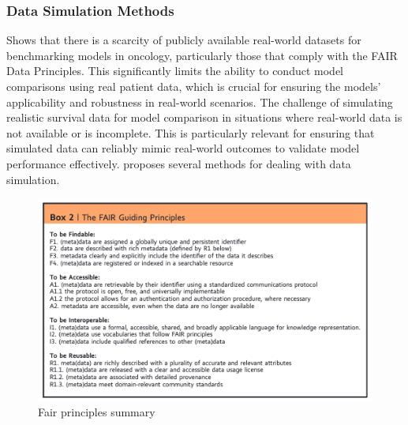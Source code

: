 \subsubsection{Data Simulation Methods}
\noindent \parencite{thurow_how_2023} Shows that there is a scarcity of publicly available real-world datasets for benchmarking models in oncology, particularly those that comply with the FAIR Data Principles. This significantly limits the ability to conduct model comparisons using real patient data, which is crucial for ensuring the models' applicability and robustness in real-world scenarios. The challenge of simulating realistic survival data for model comparison in situations where real-world data is not available or is incomplete. This is particularly relevant for ensuring that simulated data can reliably mimic real-world outcomes to validate model performance effectively. \parencite{thurow_how_2023} proposes several methods for dealing with data simulation.
\begin{figure}
	\includegraphics[scale=0.85]{Figures/FAIR_PRINCIPLES.png}
	\caption{\parencite{wilkinson_fair_2016} Fair principles summary}
\end{figure}

